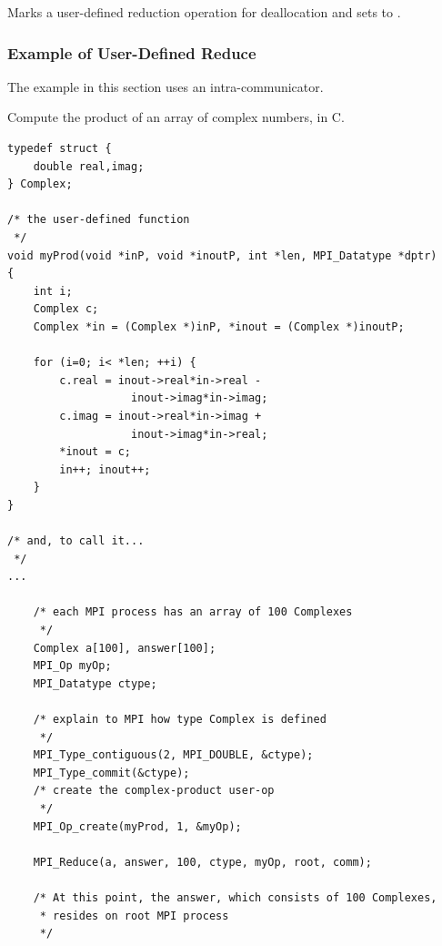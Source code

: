 Marks a user-defined reduction operation for deallocation and sets
 to .

\subsubsection{Example of User-Defined Reduce}
\label{coll-user-reduce-example}

The example in this section uses an intra-communicator.

\begin{example}
\label{coll-exX}
%
Compute the product of an array of complex numbers, in C.
\begin{lstlisting}[language={[MPI]C}]
typedef struct {
    double real,imag;
} Complex;

/* the user-defined function
 */
void myProd(void *inP, void *inoutP, int *len, MPI_Datatype *dptr)
{
    int i;
    Complex c;
    Complex *in = (Complex *)inP, *inout = (Complex *)inoutP;

    for (i=0; i< *len; ++i) {
        c.real = inout->real*in->real -
                   inout->imag*in->imag;
        c.imag = inout->real*in->imag +
                   inout->imag*in->real;
        *inout = c;
        in++; inout++;
    }
}

/* and, to call it...
 */
...

    /* each MPI process has an array of 100 Complexes
     */
    Complex a[100], answer[100];
    MPI_Op myOp;
    MPI_Datatype ctype;

    /* explain to MPI how type Complex is defined
     */
    MPI_Type_contiguous(2, MPI_DOUBLE, &ctype);
    MPI_Type_commit(&ctype);
    /* create the complex-product user-op
     */
    MPI_Op_create(myProd, 1, &myOp);

    MPI_Reduce(a, answer, 100, ctype, myOp, root, comm);

    /* At this point, the answer, which consists of 100 Complexes,
     * resides on root MPI process
     */
\end{lstlisting}
\end{example}

